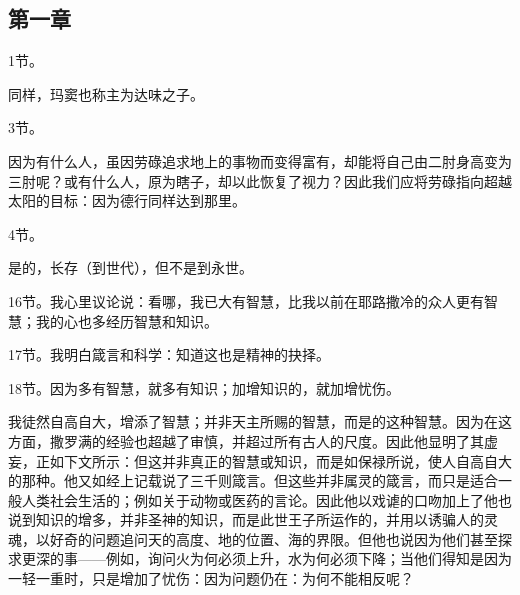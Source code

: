 
\subsection{第一章}

1节。\par

同样，玛窦也称主为达味之子。\par

3节。\par

因为有什么人，虽因劳碌追求地上的事物而变得富有，却能将自己由二肘身高变为三肘呢？或有什么人，原为瞎子，却以此恢复了视力？因此我们应将劳碌指向超越太阳的目标：因为德行同样达到那里。\par

4节。\par

是的，长存（到世代），但不是到永世。\par

16节。我心里议论说：看哪，我已大有智慧，比我以前在耶路撒冷的众人更有智慧；我的心也多经历智慧和知识。\par

17节。我明白箴言和科学：知道这也是精神的抉择。\par

18节。因为多有智慧，就多有知识；加增知识的，就加增忧伤。\par

我徒然自高自大，增添了智慧；并非天主所赐的智慧，而是的这种智慧。因为在这方面，撒罗满的经验也超越了审慎，并超过所有古人的尺度。因此他显明了其虚妄，正如下文所示：但这并非真正的智慧或知识，而是如保禄所说，使人自高自大的那种。他又如经上记载说了三千则箴言。但这些并非属灵的箴言，而只是适合一般人类社会生活的；例如关于动物或医药的言论。因此他以戏谑的口吻加上了他也说到知识的增多，并非圣神的知识，而是此世王子所运作的，并用以诱骗人的灵魂，以好奇的问题追问天的高度、地的位置、海的界限。但他也说因为他们甚至探求更深的事——例如，询问火为何必须上升，水为何必须下降；当他们得知是因为一轻一重时，只是增加了忧伤：因为问题仍在：为何不能相反呢？\par


